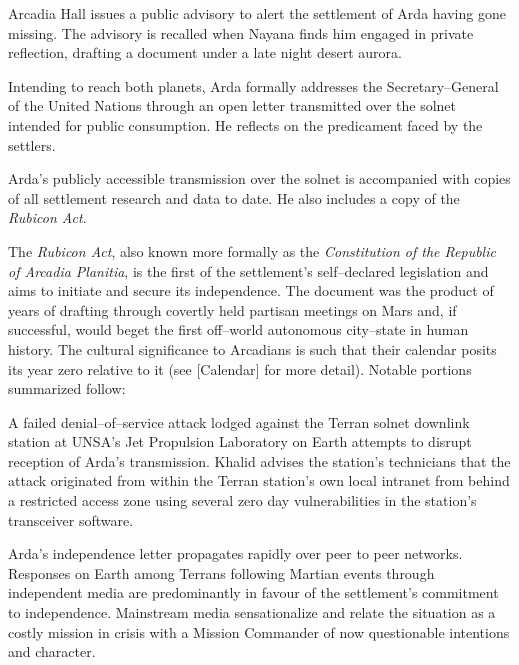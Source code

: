 Arcadia Hall issues a public advisory to alert the settlement of Arda having gone missing. The advisory is recalled when Nayana finds him engaged in private reflection, drafting a document under a late night desert aurora.
\StopTimelineDate


Intending to reach both planets, Arda formally addresses the Secretary--General of the United Nations through an open letter transmitted over the solnet intended for public consumption. He reflects on the predicament faced by the settlers.

\startTimelineCorrespondenceDocument
    
\stopTimelineCorrespondenceDocument

Arda's publicly accessible transmission over the solnet is accompanied with copies of all settlement research and data to date. He also includes a copy of the {\it Rubicon Act}. 

The {\it Rubicon Act}, also known more formally as the {\it Constitution of the Republic of Arcadia Planitia}, is the first of the settlement's self--declared legislation and aims to initiate and secure its independence. The document was the product of years of drafting through covertly held partisan meetings on Mars and, if successful, would beget the first off--world autonomous city--state in human history. The cultural significance to Arcadians is such that their calendar posits its year zero relative to it (see [Calendar] for more detail). Notable portions summarized follow:

\startTimelineGeneralDocument
    
\stopTimelineGeneralDocument

A failed denial--of--service attack lodged against the Terran solnet downlink station at UNSA's Jet Propulsion Laboratory on Earth attempts to disrupt reception of Arda's transmission. Khalid advises the station's technicians that the attack originated from within the Terran station's own local intranet from behind a restricted access zone using several zero day vulnerabilities in the station's transceiver software.

Arda's independence letter propagates rapidly over peer to peer networks. Responses on Earth among Terrans following Martian events through independent media are predominantly in favour of the settlement's commitment to independence. Mainstream media sensationalize and relate the situation as a costly mission in crisis with a Mission Commander of now questionable intentions and character.
\StopTimelineDate

